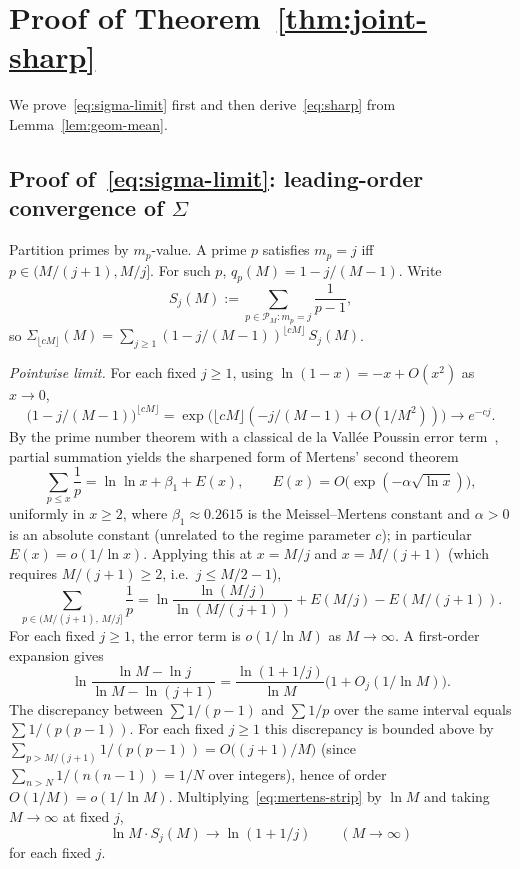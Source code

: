 \documentclass[11pt]{article}
\theoremstyle{remark}
\newcommand{\PM}{\mathcal{P}_M}
\begin{document}
\section{Proof of Theorem~\ref{thm:joint-sharp}}\label{sec:thm4}

We prove~\eqref{eq:sigma-limit} first and then derive~\eqref{eq:sharp} from Lemma~\ref{lem:geom-mean}.

\subsection{Proof of~\eqref{eq:sigma-limit}: leading-order convergence of $\Sigma$}\label{sec:thm4-leading}

Partition primes by $m_p$-value. A prime $p$ satisfies $m_p = j$ iff $p \in (M/(j+1), M/j]$. For such $p$, $q_p(M) = 1 - j/(M-1)$. Write
\[
S_j(M) := \sum_{p \in \PM \colon m_p = j} \frac{1}{p-1},
\]
so $\Sigma_{\lfloor cM \rfloor}(M) = \sum_{j \geq 1}(1 - j/(M-1))^{\lfloor cM \rfloor}\, S_j(M)$.

\emph{Pointwise limit.} For each fixed $j \geq 1$, using $\ln(1 - x) = -x + O(x^2)$ as $x \to 0$,
\[
\bigl(1 - j/(M-1)\bigr)^{\lfloor cM \rfloor} = \exp\bigl(\lfloor cM \rfloor(-j/(M-1) + O(1/M^2))\bigr) \longrightarrow e^{-cj}.
\]
By the prime number theorem with a classical de la Vall\'ee Poussin error term~\cite[Ch.~I.3]{Tenenbaum2015}, partial summation yields the sharpened form of Mertens' second theorem
\[
\sum_{p \leq x} \frac{1}{p} = \ln \ln x + \beta_1 + E(x), \qquad E(x) = O\bigl(\exp(-\alpha\sqrt{\ln x})\bigr),
\]
uniformly in $x \geq 2$, where $\beta_1 \approx 0.2615$ is the Meissel--Mertens constant and $\alpha > 0$ is an absolute constant (unrelated to the regime parameter $c$); in particular $E(x) = o(1/\ln x)$. Applying this at $x = M/j$ and $x = M/(j+1)$ (which requires $M/(j+1) \geq 2$, i.e.\ $j \leq M/2 - 1$),
\begin{equation}\label{eq:mertens-strip}
\sum_{p \in (M/(j+1),\, M/j]} \frac{1}{p} = \ln\!\frac{\ln(M/j)}{\ln(M/(j+1))} + E(M/j) - E(M/(j+1)).
\end{equation}
For each fixed $j \geq 1$, the error term is $o(1/\ln M)$ as $M \to \infty$. A first-order expansion gives
\[
\ln\!\frac{\ln M - \ln j}{\ln M - \ln(j+1)} = \frac{\ln(1 + 1/j)}{\ln M}\bigl(1 + O_j(1/\ln M)\bigr).
\]
The discrepancy between $\sum 1/(p-1)$ and $\sum 1/p$ over the same interval equals $\sum 1/(p(p-1))$. For each fixed $j \geq 1$ this discrepancy is bounded above by $\sum_{p > M/(j+1)} 1/(p(p-1)) = O\bigl((j+1)/M\bigr)$ (since $\sum_{n > N} 1/(n(n-1)) = 1/N$ over integers), hence of order $O(1/M) = o(1/\ln M)$. Multiplying~\eqref{eq:mertens-strip} by $\ln M$ and taking $M \to \infty$ at fixed $j$,
\begin{equation}\label{eq:Sj-pointwise}
\ln M \cdot S_j(M) \longrightarrow \ln(1 + 1/j) \qquad (M \to \infty)
\end{equation}
for each fixed $j$.
\end{document}
